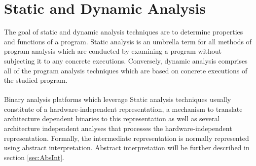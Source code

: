 \documentclass{kththesis}
\newcommand{\fbcomment}[1]{{#1}}
\renewcommand{\fbcomment}[1]{}
\begin{document}
\section{Static and Dynamic Analysis}
\fbcomment{\color{red}Goal: Explain challenges of static analysis. Also, pros and cons of using static and dynamic analysis}
The goal of static and dynamic analysis techniques are to determine properties and
functions of a program\cite{staticOfInd}. Static analysis is an umbrella term for all methods of program analysis which are conducted by examining a program without subjecting it to any concrete executions. Conversely, dynamic analysis comprises all of the program analysis techniques which are based on concrete executions of the studied program. %
\\ \\
Binary analysis platforms which leverage Static analysis techniques usually constitute of a hardware-independent representation, a mechanism to translate architecture dependent binaries to this representation as well as several architecture independent analyses that processes the hardware-independent representation\cite{TrABin}. Formally, the intermediate representation is normally represented using abstract interpretation\cite{Jakstab}. Abstract interpretation will be further described in section \ref{sec:AbsInt}.
\end{document}
